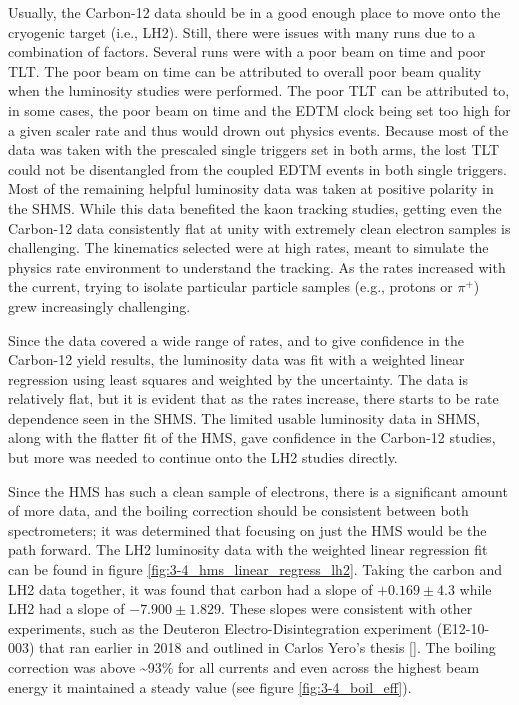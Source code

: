\documentclass[
]{report}
\begin{document}
Usually, the Carbon-12 data should be in a good enough place to move
onto the cryogenic target (i.e., LH2). Still, there were issues with
many runs due to a combination of factors. Several runs were with a poor
beam on time and poor TLT. The poor beam on time can be attributed to
overall poor beam quality when the luminosity studies were performed.
The poor TLT can be attributed to, in some cases, the poor beam on time
and the EDTM clock being set too high for a given scaler rate and thus
would drown out physics events. Because most of the data was taken with
the prescaled single triggers set in both arms, the lost TLT could not
be disentangled from the coupled EDTM events in both single triggers.
Most of the remaining helpful luminosity data was taken at positive
polarity in the SHMS. While this data benefited the kaon tracking
studies, getting even the Carbon-12 data consistently flat at unity with
extremely clean electron samples is challenging. The kinematics selected
were at high rates, meant to simulate the physics rate environment to
understand the tracking. As the rates increased with the current, trying
to isolate particular particle samples (e.g., protons or \(\pi^+\)) grew
increasingly challenging.




Since the data covered a wide range of rates, and to give confidence in
the Carbon-12 yield results, the luminosity data was fit with a weighted
linear regression using least squares and weighted by the uncertainty.
The data is relatively flat, but it is evident that as the rates
increase, there starts to be rate dependence seen in the SHMS. The
limited usable luminosity data in SHMS, along with the flatter fit of
the HMS, gave confidence in the Carbon-12 studies, but more was needed
to continue onto the LH2 studies directly.



Since the HMS has such a clean sample of electrons, there is a
significant amount of more data, and the boiling correction should be
consistent between both spectrometers; it was determined that focusing
on just the HMS would be the path forward. The LH2 luminosity data with
the weighted linear regression fit can be found in figure
\ref{fig:3-4_hms_linear_regress_lh2}. Taking the carbon and LH2 data
together, it was found that carbon had a slope of \(+0.169\pm4.3%
\) while LH2 had a slope of \(-7.900\pm 1.829%
\). These slopes were consistent with other experiments, such as the
Deuteron Electro-Disintegration experiment (E12-10-003) that ran earlier
in 2018 and outlined in Carlos Yero's thesis
{[}\cite{yero_cross_2020}{]}. The boiling correction was above
\textasciitilde93\% for all currents and even across the highest beam
energy it maintained a steady value (see figure \ref{fig:3-4_boil_eff}).
\end{document}
